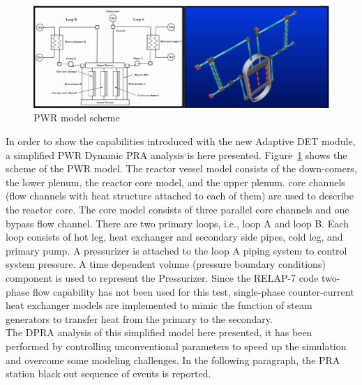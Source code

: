 \label{sec:demo}
\begin{figure}[h]
   \centering
    \includegraphics[width=1.0\textwidth]{figures/PWR_TMI_SCHEME.PNG}
    \caption{PWR model scheme}
    \label{fig:PWRmodel}
\end{figure}
In order to show the capabilities introduced with the new Adaptive DET module, a simplified PWR Dynamic PRA analysis is here presented.
Figure~\ref{fig:PWRmodel} shows the scheme of the PWR model. The reactor vessel model consists of the down-comers, the lower plenum, the reactor core model, and the upper plenum. core channels (flow channels with heat structure attached to each of them) are used to describe the reactor core. The core model consists of three parallel core channels and one bypass flow channel. There are two primary loops, i.e., loop A and loop B. Each loop consists of hot leg, heat exchanger and secondary side pipes, cold leg, and primary pump. A pressurizer is attached to the loop A piping system to control system pressure. A time dependent volume (pressure boundary conditions) component is used to represent the Pressurizer. Since the RELAP-7 code two-phase flow capability has not been used for this test, single-phase counter-current heat exchanger models are implemented to mimic the function of steam generators to transfer heat from the primary to the secondary.
\\The DPRA analysis of this simplified model here presented, it has been performed by controlling unconventional parameters to speed up the simulation and overcome some modeling challenges. In the following paragraph, the PRA station black out sequence of events is reported.


